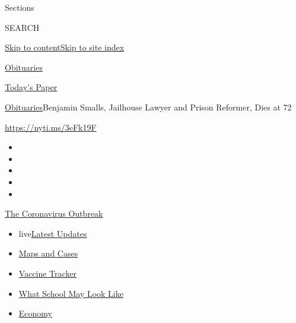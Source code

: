 Sections

SEARCH

\protect\hyperlink{site-content}{Skip to
content}\protect\hyperlink{site-index}{Skip to site index}

\href{https://www.nytimes.com/section/obituaries}{Obituaries}

\href{https://myaccount.nytimes.com/auth/login?response_type=cookie\&client_id=vi}{}

\href{https://www.nytimes.com/section/todayspaper}{Today's Paper}

\href{/section/obituaries}{Obituaries}\textbar{}Benjamin Smalls,
Jailhouse Lawyer and Prison Reformer, Dies at 72

\url{https://nyti.ms/3eFk19F}

\begin{itemize}
\item
\item
\item
\item
\item
\end{itemize}

\href{https://www.nytimes.com/news-event/coronavirus?action=click\&pgtype=Article\&state=default\&region=TOP_BANNER\&context=storylines_menu}{The
Coronavirus Outbreak}

\begin{itemize}
\tightlist
\item
  live\href{https://www.nytimes.com/2020/08/01/world/coronavirus-covid-19.html?action=click\&pgtype=Article\&state=default\&region=TOP_BANNER\&context=storylines_menu}{Latest
  Updates}
\item
  \href{https://www.nytimes.com/interactive/2020/us/coronavirus-us-cases.html?action=click\&pgtype=Article\&state=default\&region=TOP_BANNER\&context=storylines_menu}{Maps
  and Cases}
\item
  \href{https://www.nytimes.com/interactive/2020/science/coronavirus-vaccine-tracker.html?action=click\&pgtype=Article\&state=default\&region=TOP_BANNER\&context=storylines_menu}{Vaccine
  Tracker}
\item
  \href{https://www.nytimes.com/interactive/2020/07/29/us/schools-reopening-coronavirus.html?action=click\&pgtype=Article\&state=default\&region=TOP_BANNER\&context=storylines_menu}{What
  School May Look Like}
\item
  \href{https://www.nytimes.com/live/2020/07/31/business/stock-market-today-coronavirus?action=click\&pgtype=Article\&state=default\&region=TOP_BANNER\&context=storylines_menu}{Economy}
\end{itemize}

